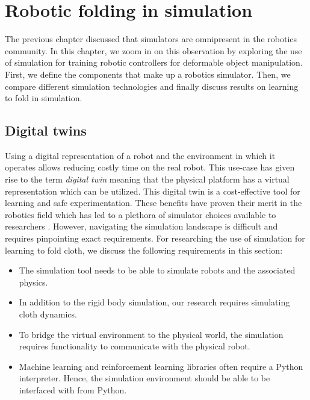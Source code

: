 \documentclass[\home/main.tex]{subfiles}
\begin{document}
\graphicspath{{\home/figures}}

\chapter{Robotic folding in simulation}\label{ch:simulation}


The previous chapter discussed that simulators are omnipresent in the robotics community.
In this chapter, we zoom in on this observation by exploring the use of simulation for training robotic controllers for deformable object manipulation. First, we define the components that make up a robotics simulator. Then, we compare different simulation technologies and finally discuss results on learning to fold in simulation.

\section{Digital twins}

Using a digital representation of a robot and the environment in which it operates allows reducing costly time on the real robot. This use-case has given rise to the term \emph{digital twin} meaning that the physical platform has a virtual representation which can be utilized. This digital twin is a cost-effective tool for learning and safe experimentation. These benefits have proven their merit in the robotics field which has led to a plethora of simulator choices available to researchers \autocite{Collins2021}. However, navigating the simulation landscape is difficult and requires pinpointing exact requirements. For researching the use of simulation for learning to fold cloth, we discuss the following requirements in this section:
\begin{itemize}
    \item The simulation tool needs to be able to simulate robots and the associated physics.
    \item In addition to the rigid body simulation, our research requires simulating cloth dynamics.
    \item To bridge the virtual environment to the physical world, the simulation requires functionality to communicate with the physical robot.
    \item Machine learning and reinforcement learning libraries often require a Python interpreter. Hence, the simulation environment should be able to be interfaced with from Python.
\end{itemize}
\end{document}
